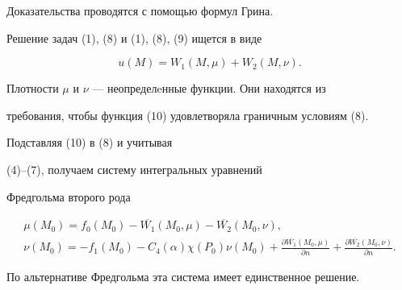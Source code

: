 Доказательства проводятся с помощью формул Грина.





Решение задач (1), (8) и (1), (8), (9) ищется в виде


\begin{equation}


u(M)=W_{1}(M,\mu)+W_{2}(M,\nu).


\end{equation}


Плотности $\mu$ и $\nu$ --- неопределeнные функции. Они находятся из 


требования, чтобы функция (10) удовлетворяла граничным условиям (8). 


Подставляя (10) в (8) и учитывая 


(4)--(7), получаем систему интегральных уравнений 


Фредгольма второго рода


\begin{gather*}


\mu(M_{0})=f_{0}(M_{0})-\overline{W_{1}}(M_{0},\mu)-


\overline{W_{2}}(M_{0},\nu), \\


%


\nu(M_{0})=-f_{1}(M_{0})-C_{4}(\alpha)\chi(P_{0})\nu(M_{0})+


\frac{\partial \overline{W_{1}}(M_{0},\mu)}{\partial n}+


\frac{\partial \overline{W_{2}}(M_{0},\nu)}{\partial n}.


\end{gather*}


По альтернативе Фредгольма эта система имеет единственное решение.





